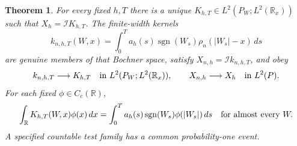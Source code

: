 \documentclass[11pt]{article}
\newtheorem{theorem}{Theorem}[section]
\newcommand{\R}{\mathbb R}\newcommand{\E}{\mathbb E}
\begin{document}
\begin{theorem}\label{thm:occupationstrong}
For every fixed $h,T$ there is a unique
$K_{h,T}\in L^2(P_W;L^2(\R_x))$ such that $X_h=\mathcal I K_{h,T}$.
The finite-width kernels
\begin{equation}\label{eq:occupationkernel}
 k_{n,h,T}(W,x)=\int_0^T a_h(s)\operatorname{sgn}(W_s)
                      \rho_n(|W_s|-x)\,ds
\end{equation}
are genuine members of that Bochner space, satisfy
$X_{n,h}=\mathcal I k_{n,h,T}$, and obey
\begin{equation}\label{eq:occupationstrong}
 k_{n,h,T}\longrightarrow K_{h,T}
 \quad\hbox{in }L^2(P_W;L^2(\R_x)),\qquad
 X_{n,h}\longrightarrow X_h\quad\hbox{in }L^2(P).
\end{equation}
For each fixed $\phi\in C_c(\R)$,
\begin{equation}\label{eq:occupationtest}
 \int_\R K_{h,T}(W,x)\phi(x)\,dx
 =\int_0^T a_h(s)\operatorname{sgn}(W_s)\phi(|W_s|)\,ds
 \quad\hbox{for almost every }W.
\end{equation}
A specified countable test family has a common probability-one event.
\end{theorem}
\end{document}
